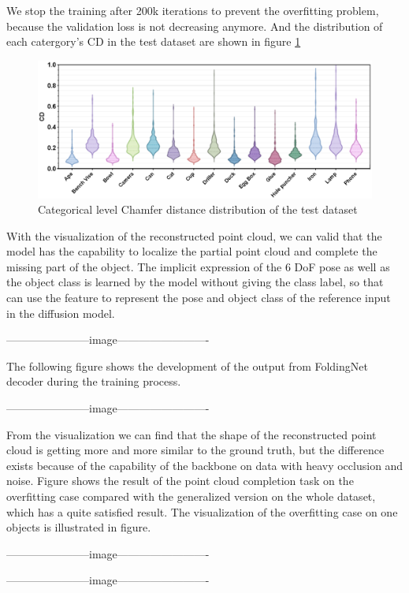 \documentclass[12pt,DIV14,BCOR12mm,a4paper,footinclude=false,headinclude,parskip=half-,twoside,openright,cleardoublepage=empty,toc=index,bibliography=totoc,listof=totoc]{scrreprt}
\numberwithin{equation}{chapter}
\begin{document}
We stop the training after 200k iterations to prevent the overfitting problem, because the validation loss is not decreasing anymore. And the distribution of each catergory's CD in the test dataset are shown in figure \ref{img:cd_cate} 

\begin{figure}[h]
	\centering
	\includegraphics[width=1.\textwidth]{img/cd_category.eps}
	\caption{Categorical level Chamfer distance distribution of the test dataset}
	\label{img:cd_cate}
\end{figure}

With the visualization of the reconstructed point cloud, we can valid that the model has the capability to localize the partial point cloud and complete the missing part of the object. The implicit expression of the 6 DoF pose as well as the object class is learned by the model without giving the class label, so that can use the feature to represent the pose and object class of the reference input in the diffusion model.

-----------------------image-------------------------

The following figure shows the development of the output from FoldingNet decoder during the training process.

-----------------------image-------------------------

From the visualization we can find that the shape of the reconstructed point cloud is getting more and more similar to the ground truth, but the difference exists because of the capability of the backbone on data with heavy occlusion and noise. Figure shows the result of the point cloud completion task on the overfitting case compared with the generalized version on the whole dataset, which has a quite satisfied result. The visualization of the overfitting case on one objects is illustrated in figure.

-----------------------image-------------------------

-----------------------image-------------------------
\end{document}
